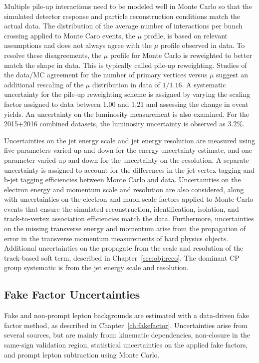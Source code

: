 Multiple pile-up interactions need to be modeled well in Monte Carlo so that the simulated detector response and particle reconstruction conditions match the actual data.  The distribution of the average number of interactions per bunch crossing applied to Monte Caro events, the $\mu$ profile, is based on relevant assumptions and does not always agree with the $\mu$ profile observed in data.  To resolve these disagreements, the $\mu$ profile for Monte Carlo is reweighted to better match the shape in data.  This is typically called pile-up reweighting.  Studies of the data/MC agreement for the number of primary vertices versus $\mu$ suggest an additional rescaling of the $\mu$ distribution in data of $1/1.16$.  A systematic uncertainty for the pile-up reweighting scheme is assigned by varying the scaling factor assigned to data between 1.00 and 1.21 and assessing the change in event yields.  An uncertainty on the luminosity measurement is also examined.  For the 2015+2016 combined datasets, the luminosity uncertainty is observed as $3.2\%$.

Uncertainties on the jet energy scale and jet energy resolution are measured using five parameters varied up and down for the energy uncertainty estimate, and one parameter varied up and down for the uncertainty on the resolution.  A separate uncertainty is assigned to account for the differences in the jet-vertex tagging and b-jet tagging efficiencies between Monte Carlo and data. Uncertainties on the electron energy and momentum scale and resolution are also considered, along with uncertainties on the electron and muon scale factors applied to Monte Carlo events that ensure the simulated reconstruction, identification, isolation, and track-to-vertex association efficiencies match the data.  Furthermore, uncertainties on the missing transverse energy and momentum arise from the propagation of error in the transverse momentum measurements of hard physics objects.  Additional uncertainties on the \met propagate from the scale and resolution of the track-based soft term, described in Chapter~\ref{sec:obj:reco}.  The dominant CP group systematic is from the jet energy scale and resolution.

\subsection{Fake Factor Uncertainties}
\label{sec:sys:expFF}
Fake and non-prompt lepton backgrounds are estimated with a data-driven fake factor method, as described in Chapter~\ref{ch:fakefactor}.  Uncertainties arise from several sources, but are mainly from: kinematic dependencies, non-closure in the same-sign validation region, statistical uncertainties on the applied fake factors, and prompt lepton subtraction using Monte Carlo.


